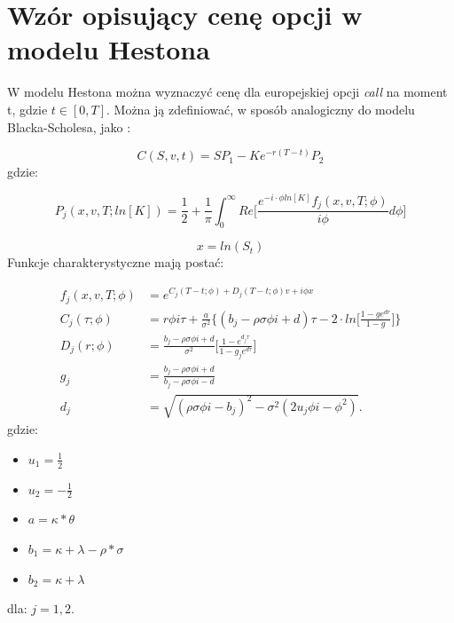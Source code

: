 \documentclass{pracamgr}
\begin{document}
\section{Wzór opisujący cenę opcji w modelu Hestona}

W modelu Hestona można wyznaczyć cenę dla europejskiej opcji \textit{call} na moment t, 
gdzie $t \in [0, T]$. Można ją zdefiniować, w sposób analogiczny do modelu Blacka-Scholesa, jako 
\cite{Heston}:

\begin{equation}
\label{eq:HestonCharacteristicFirst}
  C(S, v, t) = SP_1 -K e^{-r(T-t)} P_2
\end{equation}
gdzie:

\begin{equation}
\label{eq:HestonProb}
  P_j (x, v, T; ln[K]) = \frac{1}{2} + \frac{1}{\pi} \int_{0}^{\infty} Re \bigg[ \frac{e^{-i \cdot \phi ln[K]} f_j(x, v, T; \phi) }{i \phi} d \phi \bigg]
\end{equation}

\begin{equation}
  x = ln(S_t)
\end{equation}
Funkcje charakterystyczne mają postać: 

\begin{equation}
\label{eq:HestonCharacteristic}
  \begin{aligned}
f_j(x, v, T; \phi) &= e^{C_j(T-t; \phi) + D_j(T-t; \phi)v + i \phi x} \\
C_j (\tau; \phi)     &= r \phi i \tau + \frac{a}{\sigma^2} \bigg\{ (b_j - \rho \sigma \phi i + d) \tau - 2 \cdot ln \bigg[ \frac{1 - ge^{dr}}{1-g} \bigg] \bigg\} \\
D_j (r; \phi)        &= \frac{b_j- \rho \sigma \phi i + d}{\sigma^2} \bigg[ \frac{1 - e^{d_j \tau}}{1 - g_je^{d\tau}} \bigg]   \\
g_j                &= \frac{b_j - \rho \sigma \phi i + d}{b_j - \rho \sigma \phi i - d} \\
d_j                &= \sqrt{(\rho \sigma \phi i  - b_j)^2 - \sigma^2(2 u_j \phi  i  - \phi^2)}.
  \end{aligned}
\end{equation}
gdzie:
\begin{itemize}
  \item  $ u_1 = \frac{1}{2}$
  \item  $ u_2 = -\frac{1}{2}$
  \item  $ a = \kappa * \theta$
  \item  $ b_1 = \kappa + \lambda - \rho * \sigma$
  \item  $ b_2 = \kappa + \lambda$
\end{itemize}
dla: $j = 1,2$.
\end{document}
